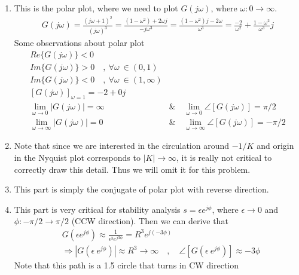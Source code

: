 \documentclass[twoside]{article}
\begin{document}
\begin{enumerate}
  \item This is the polar plot, where we need to plot $G(j \omega)$, where $\omega : 0 \to
    \infty$. 
    \begin{align*}
      G(j \omega) = \frac{(j\omega + 1)^2 }{(j \omega)^3} 
      = \frac{ (1 - \omega^2) + 2 \omega j}{ -j \omega^3}
     = \frac{ (1 - \omega^2) j - 2 \omega}{\omega^3}
       = \frac{- 2 }{\omega^2} + \frac{ 1 - \omega^2 }{\omega^3} j
    \end{align*}
%
   Some observations about polar plot
    \begin{align*}
       Re \lbrace G(j \omega) \rbrace < 0 
      \\ 
       Im \lbrace G(j \omega) \rbrace > 0 \quad , \ \forall  \omega \ \in
      (0, 1) 
      \\
       Im \lbrace G(j \omega) \rbrace < 0 \quad , \ \forall  \omega \ \in
      (1,\infty) 
      \\
      [ G(j \omega) ]_{\omega = 1} = -2 + 0 j
      \\
        \lim_{\omega \to 0}  | G(j \omega)  | = \infty
       \quad & \& \quad
       \lim_{\omega \to 0} \angle [ G(j \omega) ] = \pi/2  
        \\
       \lim_{\omega \to \infty} | G(j \omega) | = 0
        \quad & \& \quad
      \lim_{\omega \to \infty} \angle [ G(j \omega) ] = -\pi/2
      \end{align*}
  \item Note that since we are interested in the circulation around
    $-1/K$ and origin in the Nyquist plot corresponds to $| K | \to
    \infty$, it is really not critical to correctly draw this detail. 
    Thus we will omit it for this problem.
   \item This part is simply the conjugate of polar plot with reverse
     direction. 
  \item This part is very critical for stability analysis
     $s = \epsilon e^{j \phi}$, where $\epsilon \to 0$ and $\phi :
     -\pi/2 \to \pi/2$ (CCW direction).  Then  we can derive that  
   \begin{align*}
     & G \left( \epsilon e^{j \phi} \right) \approx \frac{1}{\epsilon^3 e^{j
        3\phi}} = R^3 e^{j (-3 \phi)}
       \\
    &\Rightarrow | G \left(\epsilon \ e^{j \phi} \right) | \approx
     R^3 \to \infty 
   \quad , \quad \angle [ G \left( \epsilon \ e^{j \phi} \right) ]
      \approx -3 \phi
   \end{align*}
  Note that this path is a 1.5 circle that turns in CW direction
\end{enumerate}
\end{document}
